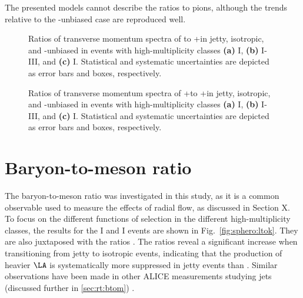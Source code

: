 The presented models cannot describe the ratios to pions, although the trends relative to the \SOPT-unbiased case are reproduced well.

\begin{figure}[H]%
\centering%
\hspace{1em}
\hspace{1em}
\caption{Ratios of transverse momentum spectra of \KOs to \pip+\pim in jetty, isotropic, and \SOPT-unbiased in events with high-multiplicity classes \textbf{(a)} \NSPD I, \textbf{(b)} \NSPD I-III, and \textbf{(c)} \VOM I. Statistical and systematic uncertainties are depicted as error bars and boxes, respectively.}
\label{fig:sphero:ktopi}
\end{figure}

\begin{figure}[H]%
\centering%
\hspace{1em}
\hspace{1em}
\caption{Ratios of transverse momentum spectra of \LA+\AL to \pip+\pim in jetty, isotropic, and \SOPT-unbiased in events with high-multiplicity classes \textbf{(a)} \NSPD I, \textbf{(b)} \NSPD I-III, and \textbf{(c)} \VOM I. Statistical and systematic uncertainties are depicted as error bars and boxes, respectively.}
\label{fig:sphero:ltopi}
\end{figure}

\section{Baryon-to-meson ratio}

The baryon-to-meson ratio \ltok was investigated in this study, as it is a common observable used to measure the effects of radial flow, as discussed in Section X. To focus on the different functions of \SOPT selection in the different high-multiplicity classes, the results for the \NSPD I and \VOM I events are shown in Fig.~\ref{fig:sphero:ltok}. They are also juxtaposed with the \ptopi ratios \cite{vazquezruedaStudyProductionPp2022}. The ratios reveal a significant increase when transitioning from jetty to isotropic events, indicating that the production of heavier $\LA$ is systematically more suppressed in jetty events than \KOs. Similar observations have been made in other ALICE measurements studying jets (discussed further in \ref{sec:rt:btom}) \cite{acharyaProductionKS0Jets2022}.

